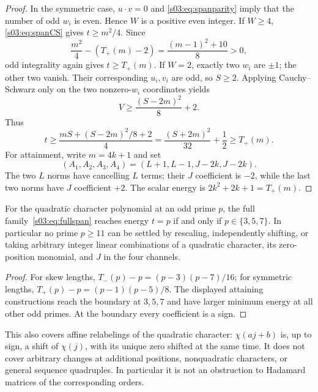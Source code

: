 \begin{proof}
In the symmetric case, $u\cdot v=0$ and
\eqref{s03:eq:spanparity} imply that the number of odd $w_i$ is even.
Hence $W$ is a positive even integer. If $W\ge4$,
\eqref{s03:eq:spanCS} gives $t\ge m^2/4$. Since
\[
 \frac{m^2}{4}-(T_+(m)-2)
 =\frac{(m-1)^2+10}{8}>0,
\]
odd integrality again gives $t\ge T_+(m)$. If $W=2$, exactly two
$w_i$ are $\pm1$; the other two vanish. Their corresponding $u_i,v_i$
are odd, so $S\ge2$. Applying Cauchy--Schwarz only on the two
nonzero-$w_i$ coordinates yields
\[
 V\ge\frac{(S-2m)^2}{8}+2.
\]
Thus
\[
 t\ge\frac{mS+(S-2m)^2/8+2}{4}
 =\frac{(S+2m)^2}{32}+\frac12\ge T_+(m).
\]
For attainment, write $m=4k+1$ and set
\[
 (A_1,A_2,A_3,A_4)=(L+1,L-1,J-2k,J-2k).
\]
The two $L$ norms have cancelling $L$ terms; their $J$ coefficient
is $-2$, while the last two norms have $J$ coefficient $+2$.
The scalar energy is $2k^2+2k+1=T_+(m)$.
\end{proof}

\begin{corollary}
For the quadratic character polynomial at an odd prime $p$, the full
family~\eqref{s03:eq:fullspan} reaches energy $t=p$ if and only if
$p\in\{3,5,7\}$. In particular no prime $p\ge11$ can be settled
by rescaling, independently shifting, or taking arbitrary integer
linear combinations of a quadratic character, its zero-position
monomial, and $J$ in the four channels.
\end{corollary}
\begin{proof}
For skew lengths,
$T_-(p)-p=(p-3)(p-7)/16$; for symmetric lengths,
$T_+(p)-p=(p-1)(p-5)/8$. The displayed attaining constructions
reach the boundary at $3,5,7$ and have larger minimum energy at all
other odd primes. At the boundary every coefficient is a sign.
\end{proof}

This also covers affine relabelings of the quadratic character:
$\chi(aj+b)$ is, up to sign, a shift of $\chi(j)$, with its unique
zero shifted at the same time. It does not cover arbitrary changes
at additional positions, nonquadratic characters, or general sequence
quadruples. In particular it is not an obstruction to Hadamard matrices
of the corresponding orders.

